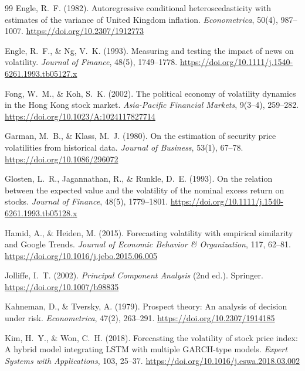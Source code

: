 \documentclass[12pt, a4paper]{article}
\begin{document}
\begin{thebibliography}{99}
Engle, R.~F. (1982).
\newblock Autoregressive conditional heteroscedasticity with estimates of the
  variance of United Kingdom inflation.
\newblock \textit{Econometrica}, 50(4), 987--1007.
\newblock \url{https://doi.org/10.2307/1912773}

Engle, R.~F., \& Ng, V.~K. (1993).
\newblock Measuring and testing the impact of news on volatility.
\newblock \textit{Journal of Finance}, 48(5), 1749--1778.
\newblock \url{https://doi.org/10.1111/j.1540-6261.1993.tb05127.x}

Fong, W.~M., \& Koh, S.~K. (2002).
\newblock The political economy of volatility dynamics in the Hong Kong stock
  market.
\newblock \textit{Asia-Pacific Financial Markets}, 9(3--4), 259--282.
\newblock \url{https://doi.org/10.1023/A:1024117827714}

Garman, M.~B., \& Klass, M.~J. (1980).
\newblock On the estimation of security price volatilities from historical
  data.
\newblock \textit{Journal of Business}, 53(1), 67--78.
\newblock \url{https://doi.org/10.1086/296072}

Glosten, L.~R., Jagannathan, R., \& Runkle, D.~E. (1993).
\newblock On the relation between the expected value and the volatility of the
  nominal excess return on stocks.
\newblock \textit{Journal of Finance}, 48(5), 1779--1801.
\newblock \url{https://doi.org/10.1111/j.1540-6261.1993.tb05128.x}

Hamid, A., \& Heiden, M. (2015).
\newblock Forecasting volatility with empirical similarity and Google Trends.
\newblock \textit{Journal of Economic Behavior \& Organization}, 117, 62--81.
\newblock \url{https://doi.org/10.1016/j.jebo.2015.06.005}

Jolliffe, I.~T. (2002).
\newblock \textit{Principal Component Analysis} (2nd ed.).
\newblock Springer.
\newblock \url{https://doi.org/10.1007/b98835}

Kahneman, D., \& Tversky, A. (1979).
\newblock Prospect theory: An analysis of decision under risk.
\newblock \textit{Econometrica}, 47(2), 263--291.
\newblock \url{https://doi.org/10.2307/1914185}

Kim, H.~Y., \& Won, C.~H. (2018).
\newblock Forecasting the volatility of stock price index: A hybrid model
  integrating LSTM with multiple GARCH-type models.
\newblock \textit{Expert Systems with Applications}, 103, 25--37.
\newblock \url{https://doi.org/10.1016/j.eswa.2018.03.002}


\end{thebibliography}
\end{document}
